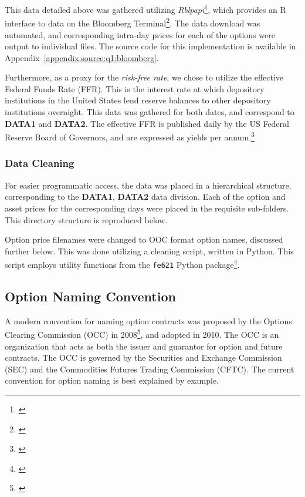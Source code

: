 \documentclass[10pt]{article}
\begin{document}
    This data detailed above was gathered utilizing \textit{Rblpapi}\footnote{\cite{Armstrong2018}}, which provides an R interface to data on the Bloomberg Terminal\footnote{\cite{BloombergL.P.2019}}. The data download was automated, and corresponding intra-day prices for each of the options were output to individual files. The source code for this implementation is available in Appendix~\ref{appendix:source:q1:bloomberg}.

    Furthermore, as a proxy for the \textit{risk-free rate}, we chose to utilize the effective Federal Funds Rate (FFR). This is the interest rate at which depository institutions in the United States lend reserve balances to other depository institutions overnight. This data was gathered for both dates, and correspond to \textbf{DATA1} and \textbf{DATA2}. The effective FFR is published daily by the US Federal Reserve Board of Governors, and are expressed as yields per annum.\footnote{\cite{BoardofGovernorsoftheFederalReserveSystem2019}}

        \subsubsection{Data Cleaning}

            For easier programmatic access, the data was placed in a hierarchical structure, corresponding to the \textbf{DATA1}, \textbf{DATA2} data division. Each of the option and asset prices for the corresponding days were placed in the requisite sub-folders. This directory structure is reproduced below.


            Option price filenames were changed to OOC format option names, discussed further below. This was done utilizing a cleaning script, written in Python. This script employs utility functions from the \texttt{fe621} Python package\footnote{\cite{Weerawarana2019}}.
    
        \subsection{Option Naming Convention}

        A modern convention for naming option contracts was proposed by the Options Clearing Commission (OCC) in 2008\footnote{\cite{OptionsSymbologyInitiative2008}}, and adopted in 2010. The OCC is an organization that acts as both the issuer and guarantor for option and future contracts. The OCC is governed by the Securities and Exchange Commission (SEC) and the Commodities Futures Trading Commission (CFTC). The current convention for option naming is best explained by example.
        
\end{document}
